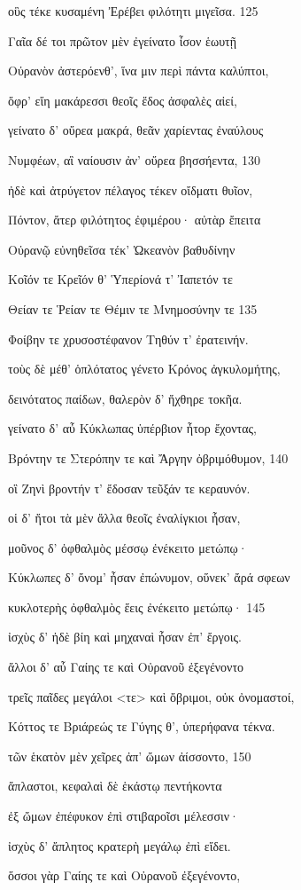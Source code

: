 οὓς τέκε κυσαμένη Ἐρέβει φιλότητι μιγεῖσα. 125

Γαῖα δέ τοι πρῶτον μὲν ἐγείνατο ἶσον ἑωυτῇ

Οὐρανὸν ἀστερόενθ', ἵνα μιν περὶ πάντα καλύπτοι,

ὄφρ' εἴη μακάρεσσι θεοῖς ἕδος ἀσφαλὲς αἰεί,

γείνατο δ' οὔρεα μακρά, θεᾶν χαρίεντας ἐναύλους 

Νυμφέων, αἳ ναίουσιν ἀν' οὔρεα βησσήεντα, 130 

ἠδὲ καὶ ἀτρύγετον πέλαγος τέκεν οἴδματι θυῖον,

Πόντον, ἄτερ φιλότητος ἐφιμέρου· αὐτὰρ ἔπειτα

Οὐρανῷ εὐνηθεῖσα τέκ' Ὠκεανὸν βαθυδίνην 

Κοῖόν τε Κρεῖόν θ' Ὑπερίονά τ' Ἰαπετόν τε

Θείαν τε Ῥείαν τε Θέμιν τε Μνημοσύνην τε 135

Φοίβην τε χρυσοστέφανον Τηθύν τ' ἐρατεινήν.

τοὺς δὲ μέθ' ὁπλότατος γένετο Κρόνος ἀγκυλομήτης,

δεινότατος παίδων, θαλερὸν δ' ἤχθηρε τοκῆα. 

γείνατο δ' αὖ Κύκλωπας ὑπέρβιον ἦτορ ἔχοντας,

Βρόντην τε Στερόπην τε καὶ Ἄργην ὀβριμόθυμον, 140

οἳ Ζηνὶ βροντήν τ' ἔδοσαν τεῦξάν τε κεραυνόν.

οἱ δ' ἤτοι τὰ μὲν ἄλλα θεοῖς ἐναλίγκιοι ἦσαν,

μοῦνος δ' ὀφθαλμὸς μέσσῳ ἐνέκειτο μετώπῳ· 

Κύκλωπες δ' ὄνομ' ἦσαν ἐπώνυμον, οὕνεκ' ἄρά σφεων

κυκλοτερὴς ὀφθαλμὸς ἕεις ἐνέκειτο μετώπῳ· 145

ἰσχὺς δ' ἠδὲ βίη καὶ μηχαναὶ ἦσαν ἐπ' ἔργοις.

ἄλλοι δ' αὖ Γαίης τε καὶ Οὐρανοῦ ἐξεγένοντο

τρεῖς παῖδες μεγάλοι \textless{}τε\textgreater{} καὶ ὄβριμοι, οὐκ
ὀνομαστοί, 

Κόττος τε Βριάρεώς τε Γύγης θ', ὑπερήφανα τέκνα. 

τῶν ἑκατὸν μὲν χεῖρες ἀπ' ὤμων ἀίσσοντο, 150

ἄπλαστοι, κεφαλαὶ δὲ ἑκάστῳ πεντήκοντα

ἐξ ὤμων ἐπέφυκον ἐπὶ στιβαροῖσι μέλεσσιν· 

ἰσχὺς δ' ἄπλητος κρατερὴ μεγάλῳ ἐπὶ εἴδει.

ὅσσοι γὰρ Γαίης τε καὶ Οὐρανοῦ ἐξεγένοντο,

